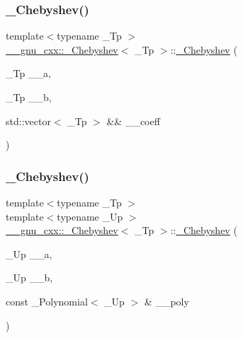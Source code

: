 \mbox{\label{class____gnu__cxx_1_1__Chebyshev_a39f37ba2a90b4fe76ee08a348cfba173}} 
\subsubsection{\texorpdfstring{\+\_\+\+Chebyshev()}{\_Chebyshev()}\hspace{0.1cm}{\footnotesize\ttfamily [5/6]}}
{\footnotesize\ttfamily template$<$typename \+\_\+\+Tp $>$ \\
\hyperlink{class____gnu__cxx_1_1__Chebyshev}{\+\_\+\+\_\+gnu\+\_\+cxx\+::\+\_\+\+Chebyshev}$<$ \+\_\+\+Tp $>$\+::\hyperlink{class____gnu__cxx_1_1__Chebyshev}{\+\_\+\+Chebyshev} (\begin{DoxyParamCaption}\item[{\+\_\+\+Tp}]{\+\_\+\+\_\+a,  }\item[{\+\_\+\+Tp}]{\+\_\+\+\_\+b,  }\item[{std\+::vector$<$ \+\_\+\+Tp $>$ \&\&}]{\+\_\+\+\_\+coeff }\end{DoxyParamCaption})\hspace{0.3cm}{\ttfamily [inline]}}

\mbox{\label{class____gnu__cxx_1_1__Chebyshev_abc2b50080347414895d47e02a0543a2c}} 
\subsubsection{\texorpdfstring{\+\_\+\+Chebyshev()}{\_Chebyshev()}\hspace{0.1cm}{\footnotesize\ttfamily [6/6]}}
{\footnotesize\ttfamily template$<$typename \+\_\+\+Tp $>$ \\
template$<$typename \+\_\+\+Up $>$ \\
\hyperlink{class____gnu__cxx_1_1__Chebyshev}{\+\_\+\+\_\+gnu\+\_\+cxx\+::\+\_\+\+Chebyshev}$<$ \+\_\+\+Tp $>$\+::\hyperlink{class____gnu__cxx_1_1__Chebyshev}{\+\_\+\+Chebyshev} (\begin{DoxyParamCaption}\item[{\+\_\+\+Up}]{\+\_\+\+\_\+a,  }\item[{\+\_\+\+Up}]{\+\_\+\+\_\+b,  }\item[{const \+\_\+\+Polynomial$<$ \+\_\+\+Up $>$ \&}]{\+\_\+\+\_\+poly }\end{DoxyParamCaption})}

